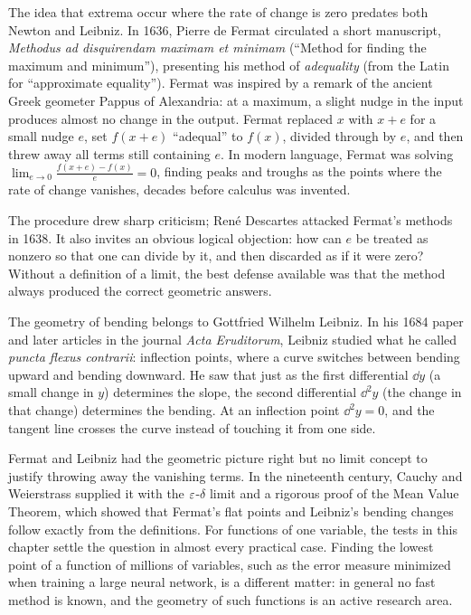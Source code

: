 \begin{historybox}
The idea that extrema occur where the rate of change is zero predates both Newton and Leibniz. In 1636, Pierre de Fermat circulated a short manuscript, \emph{Methodus ad disquirendam maximam et minimam} (``Method for finding the maximum and minimum''), presenting his method of \emph{adequality} (from the Latin for ``approximate equality''). Fermat was inspired by a remark of the ancient Greek geometer Pappus of Alexandria: at a maximum, a slight nudge in the input produces almost no change in the output. Fermat replaced $x$ with $x + e$ for a small nudge $e$, set $f(x+e)$ ``adequal'' to $f(x)$, divided through by $e$, and then threw away all terms still containing $e$. In modern language, Fermat was solving $\lim_{e\to 0}\frac{f(x+e)-f(x)}{e} = 0$, finding peaks and troughs as the points where the rate of change vanishes, decades before calculus was invented.

The procedure drew sharp criticism; Ren\'e Descartes attacked Fermat's methods in 1638. It also invites an obvious logical objection: how can $e$ be treated as nonzero so that one can divide by it, and then discarded as if it were zero? Without a definition of a limit, the best defense available was that the method always produced the correct geometric answers.

The geometry of bending belongs to Gottfried Wilhelm Leibniz. In his 1684 paper and later articles in the journal \emph{Acta Eruditorum}, Leibniz studied what he called \emph{puncta flexus contrarii}: inflection points, where a curve switches between bending upward and bending downward. He saw that just as the first differential $\dd y$ (a small change in $y$) determines the slope, the second differential $\dd^2 y$ (the change in that change) determines the bending. At an inflection point $\dd^2 y = 0$, and the tangent line crosses the curve instead of touching it from one side.

Fermat and Leibniz had the geometric picture right but no limit concept to justify throwing away the vanishing terms. In the nineteenth century, Cauchy and Weierstrass supplied it with the $\varepsilon$-$\delta$ limit and a rigorous proof of the Mean Value Theorem, which showed that Fermat's flat points and Leibniz's bending changes follow exactly from the definitions. For functions of one variable, the tests in this chapter settle the question in almost every practical case. Finding the lowest point of a function of millions of variables, such as the error measure minimized when training a large neural network, is a different matter: in general no fast method is known, and the geometry of such functions is an active research area.
\end{historybox}

